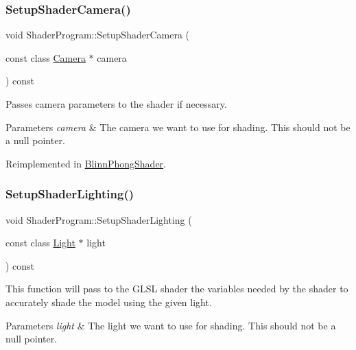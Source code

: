 \subsubsection{\texorpdfstring{Setup\+Shader\+Camera()}{SetupShaderCamera()}}
{\footnotesize\ttfamily void Shader\+Program\+::\+Setup\+Shader\+Camera (\begin{DoxyParamCaption}\item[{const class \hyperlink{class_camera}{Camera} $\ast$}]{camera }\end{DoxyParamCaption}) const\hspace{0.3cm}{\ttfamily [virtual]}}



Passes camera parameters to the shader if necessary. 


\begin{DoxyParams}{Parameters}
{\em camera} & The camera we want to use for shading. This should not be a null pointer. \\
\hline
\end{DoxyParams}


Reimplemented in \hyperlink{class_blinn_phong_shader_ab4d435ed4f4815a71590b514550dc2b7}{Blinn\+Phong\+Shader}.

\hypertarget{class_shader_program_a02cf3df43c59808160fce158ad655a40}{}\label{class_shader_program_a02cf3df43c59808160fce158ad655a40} 
\subsubsection{\texorpdfstring{Setup\+Shader\+Lighting()}{SetupShaderLighting()}}
{\footnotesize\ttfamily void Shader\+Program\+::\+Setup\+Shader\+Lighting (\begin{DoxyParamCaption}\item[{const class \hyperlink{class_light}{Light} $\ast$}]{light }\end{DoxyParamCaption}) const\hspace{0.3cm}{\ttfamily [virtual]}}



This function will pass to the G\+L\+SL shader the variables needed by the shader to accurately shade the model using the given light. 


\begin{DoxyParams}{Parameters}
{\em light} & The light we want to use for shading. This should not be a null pointer. \\
\hline
\end{DoxyParams}


